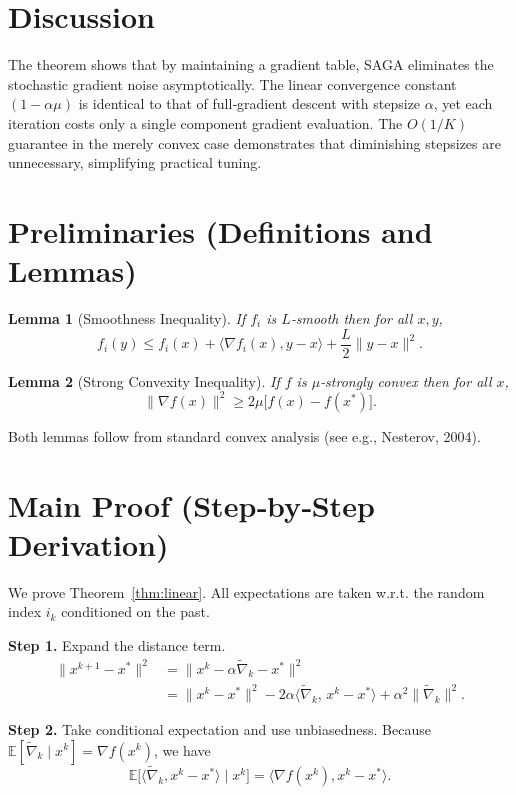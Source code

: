 \documentclass[11pt]{article}
\newtheorem{lemma}{Lemma}
\newcommand{\E}{\mathbb{E}}
\begin{document}
\section*{Discussion}
The theorem shows that by maintaining a gradient table, SAGA eliminates the stochastic gradient noise asymptotically. The linear convergence constant $(1-\alpha\mu)$ is identical to that of full‑gradient descent with stepsize $\alpha$, yet each iteration costs only a single component gradient evaluation. The $O(1/K)$ guarantee in the merely convex case demonstrates that diminishing stepsizes are unnecessary, simplifying practical tuning.

\newpage
\section*{Preliminaries (Definitions and Lemmas)}
\begin{lemma}[Smoothness Inequality]\label{lem:smooth}
If $f_i$ is $L$‑smooth then for all $x,y$,
\[
f_i(y)\le f_i(x)+\langle\nabla f_i(x),y-x\rangle+\frac{L}{2}\|y-x\|^{2}.
\]
\end{lemma}
\begin{lemma}[Strong Convexity Inequality]\label{lem:strong}
If $f$ is $\mu$‑strongly convex then for all $x$,
\[
\| \nabla f(x) \|^{2}\ge 2\mu\bigl[f(x)-f(x^{*})\bigr].
\]
\end{lemma}
Both lemmas follow from standard convex analysis (see e.g., Nesterov, 2004).

\section*{Main Proof (Step‑by‑Step Derivation)}
We prove Theorem~\ref{thm:linear}.  
All expectations are taken w.r.t. the random index $i_k$ conditioned on the past.

\noindent\textbf{Step 1.} Expand the distance term.  
\begin{align}
\|x^{k+1}-x^{*}\|^{2}
&= \bigl\|x^{k}-\alpha\tilde{\nabla}_k-x^{*}\bigr\|^{2}\nonumber\\
&= \|x^{k}-x^{*}\|^{2}
-2\alpha\langle\tilde{\nabla}_k,\,x^{k}-x^{*}\rangle
+\alpha^{2}\|\tilde{\nabla}_k\|^{2}. \tag{Step 1}
\end{align}

\noindent\textbf{Step 2.} Take conditional expectation and use unbiasedness.  
Because $\E[\tilde{\nabla}_k\mid x^{k}]=\nabla f(x^{k})$, we have
\[
\E\bigl[\langle\tilde{\nabla}_k,x^{k}-x^{*}\rangle\mid x^{k}\bigr]
= \langle\nabla f(x^{k}),x^{k}-x^{*}\rangle. \tag{Step 2}
\]
\end{document}
